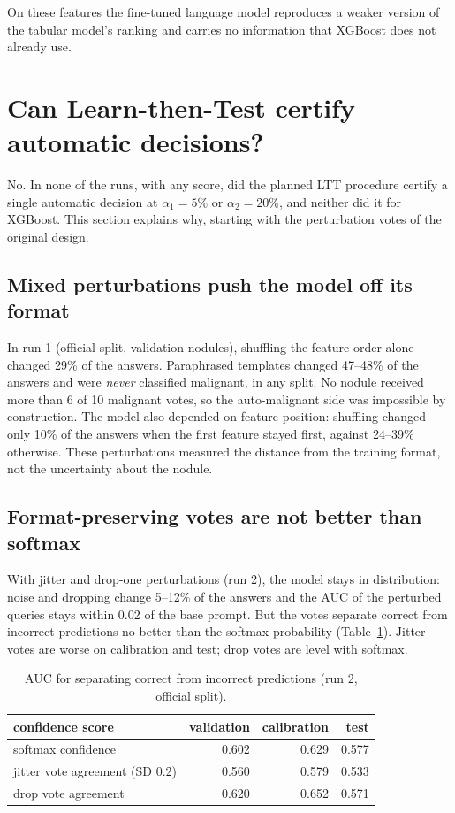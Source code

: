 On these features the fine-tuned language model reproduces a weaker version of the tabular
model's ranking and carries no information that XGBoost does not already use.

\section{Can Learn-then-Test certify automatic decisions?}
\label{sec:results-ltt}

No. In none of the runs, with any score, did the planned LTT procedure certify a single automatic
decision at $\alpha_1 = 5\%$ or $\alpha_2 = 20\%$, and neither did it for XGBoost. This section
explains why, starting with the perturbation votes of the original design.

\subsection{Mixed perturbations push the model off its format}

In run 1 (official split, validation nodules), shuffling the feature order alone changed 29\% of
the answers. Paraphrased templates changed 47--48\% of the answers and were \emph{never}
classified malignant, in any split. No nodule received more than 6 of 10 malignant votes, so the
auto-malignant side was impossible by construction. The model also depended on feature position:
shuffling changed only 10\% of the answers when the first feature stayed first, against 24--39\%
otherwise. These perturbations measured the distance from the training format, not the
uncertainty about the nodule.

\subsection{Format-preserving votes are not better than softmax}

With jitter and drop-one perturbations (run 2), the model stays in distribution: noise and
dropping change 5--12\% of the answers and the AUC of the perturbed queries stays within 0.02 of
the base prompt. But the votes separate correct from incorrect predictions no better than the
softmax probability (Table~\ref{tab:results-errsep}). Jitter votes are worse on calibration and
test; drop votes are level with softmax.

\begin{table}[ht]
  \centering
  \caption{AUC for separating correct from incorrect predictions (run 2, official split).}
  \label{tab:results-errsep}
  \begin{tabular}{lrrr}
    \toprule
    confidence score & validation & calibration & test \\
    \midrule
    softmax confidence          & 0.602 & 0.629 & 0.577 \\
    jitter vote agreement (SD 0.2) & 0.560 & 0.579 & 0.533 \\
    drop vote agreement         & 0.620 & 0.652 & 0.571 \\
    \bottomrule
  \end{tabular}
\end{table}

